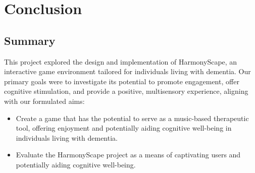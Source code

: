 \documentclass{l4proj}
\begin{document}



\chapter{Conclusion}    

\section{Summary}
This project explored the design and implementation of HarmonyScape, an interactive game environment tailored for individuals living with dementia. Our primary goals were to investigate its potential to promote engagement, offer cognitive stimulation, and provide a positive, multisensory experience, aligning with our formulated aims:

\begin{itemize}
    \item Create a game that has the potential to serve as a music-based therapeutic tool, offering enjoyment and potentially aiding cognitive well-being in individuals living with dementia.
    \item Evaluate the HarmonyScape project as a means of captivating users and potentially aiding cognitive well-being. 
\end{itemize}
\end{document}
